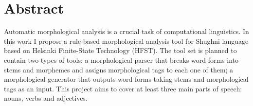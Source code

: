 \section*{Abstract}

Automatic morphological analysis is a crucial task of computational linguistics. In this work I propose a rule-based morphological analysis tool for Shughni language based on Helsinki Finite-State Technology (HFST). The tool set is planned to contain two types of tools: a morphological parser that breaks word-forms into stems and morphemes and assigns morphological tags to each one of them; a morphological generator that outputs word-forms taking stems and morphological tags as an input. This project aims to cover at least three main parts of speech: nouns, verbs and adjectives. 

\newpage